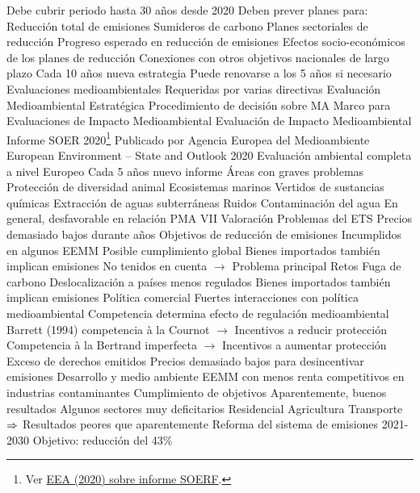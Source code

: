 \documentclass{nuevotema}
\begin{document}
\begin{esquemal}
				\4 Debe cubrir periodo hasta 30 años desde 2020
				\4 Deben prever planes para:
				\4[] Reducción total de emisiones
				\4[] Sumideros de carbono
				\4[] Planes sectoriales de reducción
				\4[] Progreso esperado en reducción de emisiones
				\4[] Efectos socio-económicos de los planes de reducción
				\4[] Conexiones con otros objetivos nacionales de largo plazo
				\4 Cada 10 años nueva estrategia
				\4 Puede renovarse a los 5 años si necesario
			\3 Evaluaciones medioambientales
				\4 Requeridas por varias directivas
				\4 Evaluación Medioambiental Estratégica
				\4[] Procedimiento de decisión sobre MA
				\4[] Marco para Evaluaciones de Impacto Medioambiental
				\4 Evaluación de Impacto Medioambiental
			\3 Informe SOER 2020\footnote{Ver \href{https://www.eea.europa.eu/soer/2020}{EEA (2020) sobre informe SOERF}.}
				\4 Publicado por Agencia Europea del Medioambiente
				\4 European Environment -- State and Outlook 2020
				\4 Evaluación ambiental completa a nivel Europeo
				\4 Cada 5 años nuevo informe
				\4 Áreas con graves problemas
				\4[] Protección de diversidad animal
				\4[] Ecosistemas marinos
				\4[] Vertidos de sustancias químicas
				\4[] Extracción de aguas subterráneas
				\4[] Ruidos
				\4[] Contaminación del agua
				\4 En general, desfavorable en relación PMA VII
		\2 Valoración
			\3 Problemas del ETS
				\4 Precios demasiado bajos durante años
			\3 Objetivos de reducción de emisiones
				\4 Incumplidos en algunos EEMM
				\4 Posible cumplimiento global
				\4 Bienes importados también implican emisiones
				\4[] No tenidos en cuenta
				\4[] $\to$ Problema principal
		\2 Retos
			\3 Fuga de carbono
				\4 Deslocalización a países menos regulados
				\4 Bienes importados también implican emisiones
			\3 Política comercial
				\4 Fuertes interacciones con política medioambiental
				\4 Competencia determina efecto de regulación medioambiental
				\4[] Barrett (1994)
				\4[] competencia à la Cournot
				\4[] $\to$ Incentivos a reducir protección
				\4[] Competencia à la Bertrand imperfecta
				\4[] $\to$ Incentivos a aumentar protección
			\3 Exceso de derechos emitidos
				\4 Precios demasiado bajos para desincentivar emisiones
			\3 Desarrollo y medio ambiente
				\4 EEMM con menos renta competitivos en industrias contaminantes
			\3 Cumplimiento de objetivos
				\4 Aparentemente, buenos resultados
				\4 Algunos sectores muy deficitarios
				\4[] Residencial
				\4[] Agricultura
				\4[] Transporte
				\4[] $\Rightarrow$ Resultados peores que aparentemente
			\3 Reforma del sistema de emisiones 2021-2030
				\4 Objetivo: reducción del 43\%

\end{esquemal}
\end{document}
